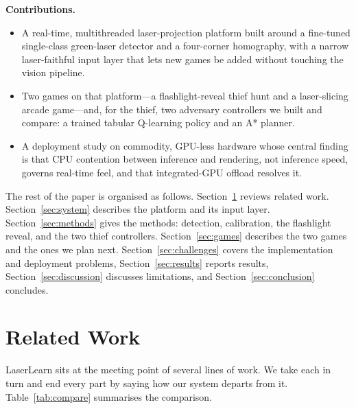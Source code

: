 \documentclass[conference]{IEEEtran}
\begin{document}
\noindent\textbf{Contributions.}
\begin{itemize}
\item A real-time, multithreaded laser-projection platform built around a
fine-tuned single-class green-laser detector and a four-corner homography, with a
narrow laser-faithful input layer that lets new games be added without touching
the vision pipeline.
\item Two games on that platform---a flashlight-reveal thief hunt and a
laser-slicing arcade game---and, for the thief, two adversary controllers we
built and compare: a trained tabular Q-learning policy and an A* planner.
\item A deployment study on commodity, GPU-less hardware whose central finding is
that CPU contention between inference and rendering, not inference speed, governs
real-time feel, and that integrated-GPU offload resolves it.
\end{itemize}

The rest of the paper is organised as follows. Section~\ref{sec:related} reviews
related work. Section~\ref{sec:system} describes the platform and its input
layer. Section~\ref{sec:methods} gives the methods: detection, calibration, the
flashlight reveal, and the two thief controllers. Section~\ref{sec:games}
describes the two games and the ones we plan next. Section~\ref{sec:challenges}
covers the implementation and deployment problems, Section~\ref{sec:results}
reports results, Section~\ref{sec:discussion} discusses limitations, and
Section~\ref{sec:conclusion} concludes.

\section{Related Work}\label{sec:related}
LaserLearn sits at the meeting point of several lines of work. We take each in
turn and end every part by saying how our system departs from it.
Table~\ref{tab:compare} summarises the comparison.

\end{document}
